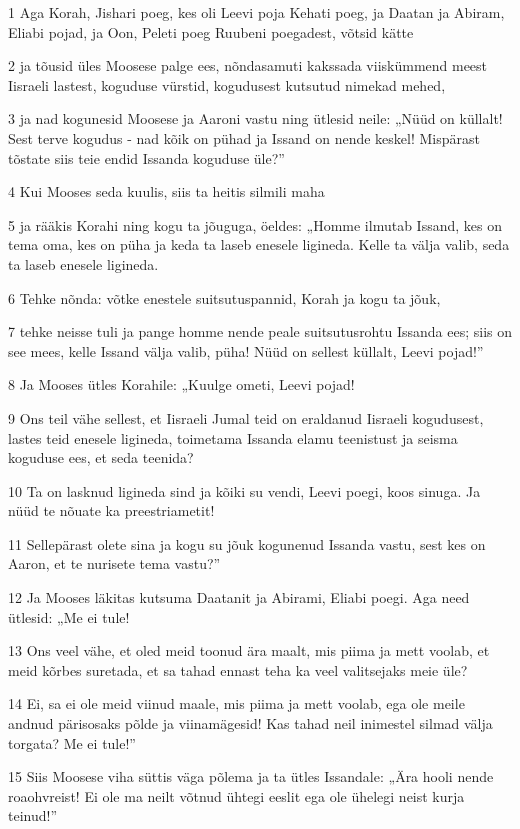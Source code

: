 \par 1 Aga Korah, Jishari poeg, kes oli Leevi poja Kehati poeg, ja Daatan ja Abiram, Eliabi pojad, ja Oon, Peleti poeg Ruubeni poegadest, võtsid kätte
\par 2 ja tõusid üles Moosese palge ees, nõndasamuti kakssada viiskümmend meest Iisraeli lastest, koguduse vürstid, kogudusest kutsutud nimekad mehed,
\par 3 ja nad kogunesid Moosese ja Aaroni vastu ning ütlesid neile: „Nüüd on küllalt! Sest terve kogudus - nad kõik on pühad ja Issand on nende keskel! Mispärast tõstate siis teie endid Issanda koguduse üle?”
\par 4 Kui Mooses seda kuulis, siis ta heitis silmili maha
\par 5 ja rääkis Korahi ning kogu ta jõuguga, öeldes: „Homme ilmutab Issand, kes on tema oma, kes on püha ja keda ta laseb enesele ligineda. Kelle ta välja valib, seda ta laseb enesele ligineda.
\par 6 Tehke nõnda: võtke enestele suitsutuspannid, Korah ja kogu ta jõuk,
\par 7 tehke neisse tuli ja pange homme nende peale suitsutusrohtu Issanda ees; siis on see mees, kelle Issand välja valib, püha! Nüüd on sellest küllalt, Leevi pojad!”
\par 8 Ja Mooses ütles Korahile: „Kuulge ometi, Leevi pojad!
\par 9 Ons teil vähe sellest, et Iisraeli Jumal teid on eraldanud Iisraeli kogudusest, lastes teid enesele ligineda, toimetama Issanda elamu teenistust ja seisma koguduse ees, et seda teenida?
\par 10 Ta on lasknud ligineda sind ja kõiki su vendi, Leevi poegi, koos sinuga. Ja nüüd te nõuate ka preestriametit!
\par 11 Sellepärast olete sina ja kogu su jõuk kogunenud Issanda vastu, sest kes on Aaron, et te nurisete tema vastu?”
\par 12 Ja Mooses läkitas kutsuma Daatanit ja Abirami, Eliabi poegi. Aga need ütlesid: „Me ei tule!
\par 13 Ons veel vähe, et oled meid toonud ära maalt, mis piima ja mett voolab, et meid kõrbes suretada, et sa tahad ennast teha ka veel valitsejaks meie üle?
\par 14 Ei, sa ei ole meid viinud maale, mis piima ja mett voolab, ega ole meile andnud pärisosaks põlde ja viinamägesid! Kas tahad neil inimestel silmad välja torgata? Me ei tule!”
\par 15 Siis Moosese viha süttis väga põlema ja ta ütles Issandale: „Ära hooli nende roaohvreist! Ei ole ma neilt võtnud ühtegi eeslit ega ole ühelegi neist kurja teinud!”
